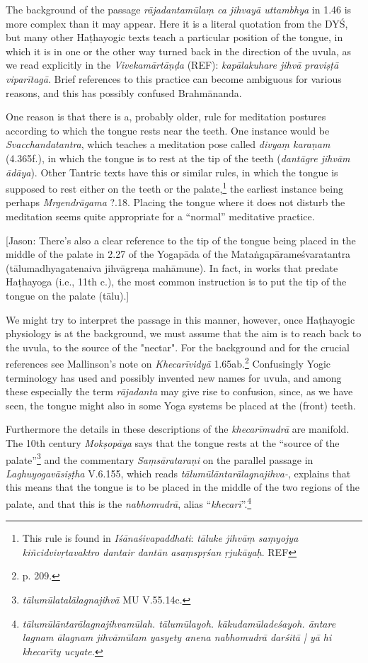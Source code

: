 \begin{ekdosis}
\begin{philcomm}[hp01_045]
[JH] The background of the passage \emph{rājadantamūlaṃ ca jihvayā uttambhya} in 1.46 is more complex
than it may appear. Here it is a literal quotation from the DYŚ, but many other Haṭhayogic texts
teach a particular position of the tongue, in which it is in one or the other way turned back in
the direction of the uvula, as we read explicitly in the \emph{Vivekamārtāṇḍa} (REF):
\emph{kapālakuhare jihvā praviṣṭā viparītagā}. Brief references to this practice can become
ambiguous for various reasons, and this has possibly confused Brahmānanda.

One reason is that there is a, probably older, rule for meditation postures according to which the
tongue rests near the teeth. One instance would be \emph{Svacchandatantra}, which teaches a
meditation pose called \emph{divyaṃ karaṇam} (4.365f.), in which the tongue is to rest at the tip
of the teeth (\emph{dantāgre jihvām ādāya}). Other Tantric texts have this or similar rules, in
which the tongue is supposed to rest either on the teeth or the palate,\footnote{This rule is
found in \emph{Iśānaśivapaddhati}: \emph{tāluke jihvāṃ saṃyojya kiñcidvivṛtavaktro dantair dantān
  asaṃspṛśan ṛjukāyaḥ}. REF} the earliest instance being perhaps \emph{Mrgendrāgama} ?.18.
Placing the tongue where it does not disturb the meditation seems quite appropriate for a
``normal'' meditative practice.

[Jason: There’s also a clear reference to the tip of the tongue being placed in the middle of the palate in 2.27 of the Yogapāda of the Mataṅgapārameśvaratantra (tālumadhyagatenaiva jihvāgreṇa mahāmune). In fact, in works that predate Haṭhayoga (i.e., 11th c.), the most common instruction is to put the tip of the tongue on the palate (tālu).]

We might try to interpret the passage in this manner, however, once Haṭhayogic physiology is at the
background, we must assume that the aim is to reach back to the uvula, to the source of the
"nectar".  For the background and for the crucial references see Mallinson's note on
\emph{Khecarīvidyā} 1.65ab.\footnote{p. 209.}  Confusingly Yogic terminology has used and possibly
invented new names for uvula, and among these especially the term \emph{rājadanta} may give rise to
confusion, since, as we have seen, the tongue might also in some Yoga systems be placed at the
(front) teeth.

Furthermore the details in these descriptions of the \emph{khecarīmudrā} are manifold. The 10th
century \emph{Mokṣopāya} says that the tongue rests at the ``source of the
palate''\footnote{\emph{tālumūlatalālagnajihvā} MU V.55.14c.} and the commentary
\emph{Saṃsārataraṇi} on the parallel passage in \emph{Laghuyogavāsiṣṭha} V.6.155, which reads
\emph{tālumūlāntarālagnajihva-}, explains that this means that the tongue is to be placed in the
middle of the two regions of the palate, and that this is the \emph{nabhomudrā}, alias
``\emph{khecarī}''.\footnote{\emph{tālumūlāntarālagnajihvamūlah. tālumūlayoh. kākudamūladeśayoh. āntare
  lagnam ālagnam jihvāmūlam yasyety anena nabhomudrā darśitā | yā hi khecarı̄ty ucyate.}}


\end{philcomm}
\end{ekdosis}
